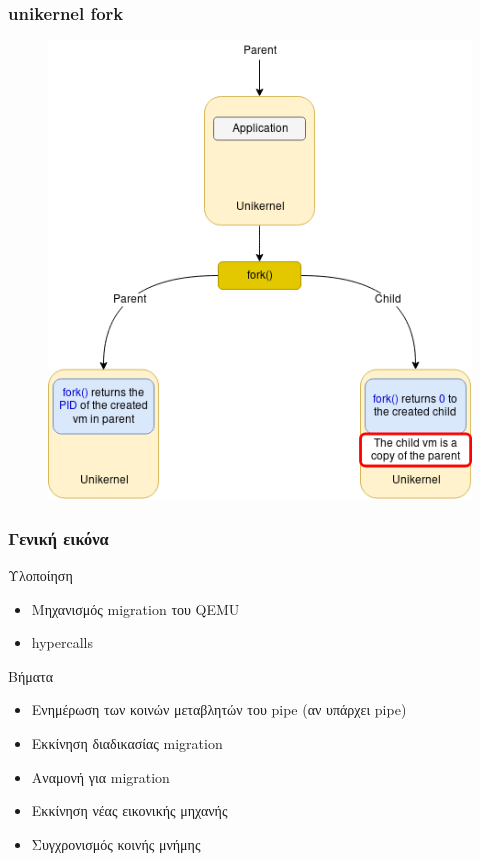 \documentclass[red,slidestop,notes,compress,mathserif]{beamer}
\begin{document}
\begin{frame}
\frametitle{unikernel fork}
\begin{figure}
\center
\includegraphics[scale=0.4]{figures/unikernel_fork.png}
\end{figure}
\end{frame}

\begin{frame}
\frametitle{Γενική εικόνα}
\begin{block}{Υλοποίηση}
\begin{itemize}
\item Μηχανισμός migration του QEMU
\item hypercalls 
\end{itemize}
\end{block}
\begin{block}{Βήματα}
\begin{itemize}
\item Ενημέρωση των κοινών μεταβλητών του pipe (αν υπάρχει pipe)
\item Εκκίνηση διαδικασίας migration
\item Αναμονή για migration
\item Εκκίνηση νέας εικονικής μηχανής 
\item Συγχρονισμός κοινής μνήμης
\end{itemize}
\end{block}
\end{frame}
\end{document}
